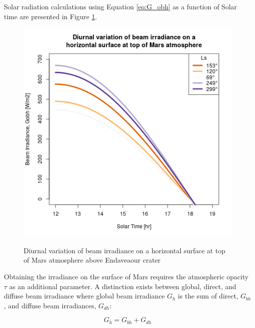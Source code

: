 Solar radiation calculations using Equation \ref{eq:G_obh} as a function of Solar time are presented in Figure \ref{fig:plot:diurnal-variation-of-beam-irradiance-on-a-horizontal-surface-at-top-of-mars-atmosphere}.

\begin{figure}[H]
  \centering
  \hypersetup{linkcolor=captionTextColor}
  \includegraphics[width=0.8\linewidth]{sections/martian-environment/plots/diurnal-variation-of-beam-irradiance-on-a-horizontal-surface-at-top-of-mars-atmosphere.png}\\
  \caption[Diurnal variation of beam irradiance on a horizontal surface at top of Mars atmosphere above Endaveaour crater]
  {Diurnal variation of beam irradiance on a horizontal surface at top of Mars atmosphere above Endaveaour crater}
  \label{fig:plot:diurnal-variation-of-beam-irradiance-on-a-horizontal-surface-at-top-of-mars-atmosphere}
\end{figure}


Obtaining the irradiance on the surface of Mars requires the atmospheric opacity $\tau$ as an additional parameter. A distinction exists between global, direct, and diffuse beam irradiance where global beam irradiance $G_{h}$ is the sum of direct, $G_{bh}$, and diffuse beam irradiances, $G_{dh}$:

\begin{equation}
  \label{eq:G_h_1}
  G_{h} = G_{bh} + G_{dh}
\end{equation}

